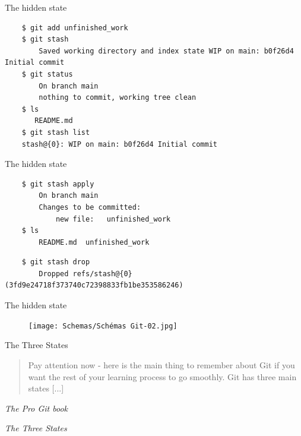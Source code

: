 \documentclass[10pt,aspectratio=169]{beamer}
\begin{document}
\begin{frame}[fragile]{The hidden state}
    \begin{verbatim}
    $ git add unfinished_work
    $ git stash
        Saved working directory and index state WIP on main: b0f26d4 Initial commit
    $ git status
        On branch main
        nothing to commit, working tree clean
    $ ls
       README.md
    $ git stash list
    stash@{0}: WIP on main: b0f26d4 Initial commit
    \end{verbatim}
\end{frame}

\begin{frame}[fragile]{The hidden state}
    \begin{verbatim}
    $ git stash apply
        On branch main
        Changes to be committed:
            new file:   unfinished_work
    $ ls
        README.md  unfinished_work
    \end{verbatim}

    \begin{verbatim}
    $ git stash drop
        Dropped refs/stash@{0} (3fd9e24718f373740c72398833fb1be353586246)
    \end{verbatim}
\end{frame}

\begin{frame}[fragile]{The hidden state}
    \begin{figure}
        \texttt{[image: Schemas/Schémas Git-02.jpg]}
    \end{figure}
\end{frame}


\begin{frame}[fragile]{The Three States}
    \begin{quote}
        Pay attention now - here is the main thing to remember about Git if you want the rest of your learning process to go smoothly. Git has three main states [...]
    \end{quote}
    \begin{flushright}
        \textit{The Pro Git book}
    \end{flushright}

    \textit{The Three States}
\end{frame}
\end{document}
